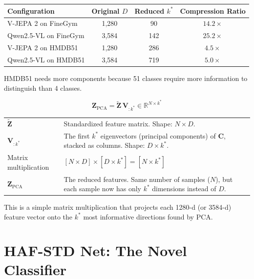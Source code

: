 \documentclass[12pt, a4paper]{article}
\begin{document}
\begin{examplebox}
\begin{center}
\begin{tabular}{lccc}
\toprule
\textbf{Configuration} & \textbf{Original $D$} & \textbf{Reduced $k^*$} & \textbf{Compression Ratio} \\
\midrule
V-JEPA 2 on FineGym & 1,280 & 90 & $14.2\times$ \\
Qwen2.5-VL on FineGym & 3,584 & 142 & $25.2\times$ \\
V-JEPA 2 on HMDB51 & 1,280 & 286 & $4.5\times$ \\
Qwen2.5-VL on HMDB51 & 3,584 & 719 & $5.0\times$ \\
\bottomrule
\end{tabular}
\end{center}
HMDB51 needs more components because 51 classes require more information to distinguish than 4 classes.
\end{examplebox}

\begin{eqbox}
\[
\mathbf{Z}_{\text{PCA}} = \tilde{\mathbf{Z}} \, \mathbf{V}_{:k^*} \in \mathbb{R}^{N \times k^*}
\]
\end{eqbox}

\begin{explainbox}
\begin{tabular}{lp{11cm}}
$\tilde{\mathbf{Z}}$ & Standardized feature matrix. Shape: $N \times D$.\\[0.2cm]
$\mathbf{V}_{:k^*}$ & The first $k^*$ eigenvectors (principal components) of $\mathbf{C}$, stacked as columns. Shape: $D \times k^*$.\\[0.2cm]
Matrix multiplication & $[N \times D] \times [D \times k^*] = [N \times k^*]$\\[0.2cm]
$\mathbf{Z}_{\text{PCA}}$ & The reduced features. Same number of samples ($N$), but each sample now has only $k^*$ dimensions instead of $D$.
\end{tabular}

This is a simple matrix multiplication that projects each 1280-d (or 3584-d) feature vector onto the $k^*$ most informative directions found by PCA.
\end{explainbox}


\newpage
\section{HAF-STD Net: The Novel Classifier}
\end{document}
